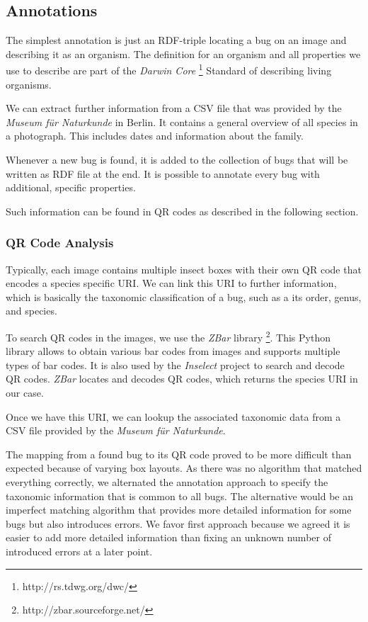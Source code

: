\subsection{Annotations}
The simplest annotation is just an RDF-triple locating a bug on an image and describing it as an organism. 
The definition for an organism and all properties we use to describe are part of the \emph{Darwin Core} \footnote{http://rs.tdwg.org/dwc/} Standard of describing living organisms.

We can extract further information from a CSV file that was provided by the \emph{Museum für Naturkunde} in Berlin.
It contains a general overview of all species in a photograph.
This includes dates and information about the family.

Whenever a new bug is found, it is added to the collection of bugs that will be written as RDF file at the end.
It is possible to annotate every bug with additional, specific properties.

Such information can be found in QR codes as described in the following section.

\subsubsection{QR Code Analysis}
Typically, each image contains multiple insect boxes with their own QR code that encodes a species specific URI.
We can link this URI to further information, which is basically the taxonomic classification of a bug, such as a its order, genus, and species.

To search QR codes in the images, we use the \emph{ZBar} library \footnote{http://zbar.sourceforge.net/}.
This Python library allows to obtain various bar codes from images and supports multiple types of bar codes.
It is also used by the \emph{Inselect} project to search and decode QR codes.
\emph{ZBar} locates and decodes QR codes, which returns the species URI in our case.

Once we have this URI, we can lookup the associated taxonomic data from a CSV file provided by the \emph{Museum für Naturkunde}.

The mapping from a found bug to its QR code proved to be more difficult than expected because of varying box layouts.
As there was no algorithm that matched everything correctly, we alternated the annotation approach to specify the taxonomic information that is common to all bugs.
The alternative would be an imperfect matching algorithm that  provides more detailed information for some bugs but also introduces errors.
We favor first approach because we agreed it is easier to add more detailed information than fixing an unknown number of introduced errors at a later point.



